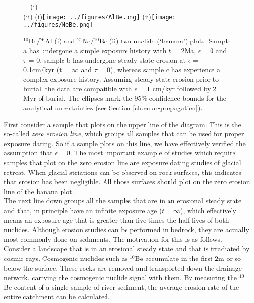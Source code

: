 \begin{figure}[!ht]
  \centering
  \ifpdf
  \def\svgwidth{.8\textwidth}
  ~~(i)~\\
  \def\svgwidth{.8\textwidth}
  (ii)
  \else
  (i)\texttt{[image: ../figures/AlBe.png]}
  (ii)\texttt{[image: ../figures/NeBe.png]}
  \fi
  \caption{$^{10}$Be/$^{26}$Al (i) and $^{21}$Ne/$^{10}$Be (ii) two
    nuclide (`banana') plots. Sample a has undergone a simple exposure
    history with $t$ = 2Ma, $\epsilon = 0$ and $\tau$ = 0, sample b has
    undergone steady-state erosion at $\epsilon$ = 0.1cm/kyr (t =
    $\infty$ and $\tau$ = 0), whereas sample c has experience a complex
    exposure history. Assuming steady-state erosion prior to burial, the
    data are compatible with $\epsilon$ = 1 cm/kyr followed by 2 Myr of
    burial. The ellipses mark the 95\% confidence bounds for the
    analytical uncertainties (see Section \ref{ch:error-propagation}).}
  \label{fig:banana}
\end{figure}

First consider a sample that plots on the upper line of the
diagram. This is the so-called \emph{zero erosion line}, which groups
all samples that can be used for proper exposure dating. So if a
sample plots on this line, we have effectively verified the assumption
that $\epsilon=0$.  The most important example of studies which
require samples that plot on the zero erosion line are exposure dating
studies of glacial retreat. When glacial striations can be observed on
rock surfaces, this indicates that erosion has been negligible. All
those surfaces should plot on the zero erosion line of the banana
plot.\\

The next line down groups all the samples that are in an erosional
steady state and that, in principle have an infinite exposure age
($t=\infty$), which effectively means an exposure age that is greater
than five times the half lives of both nuclides.  Although erosion
studies can be performed in bedrock, they are actually most commonly
done on sediments. The motivation for this is as follows. Consider a
landscape that is in an erosional steady state and that is irradiated
by cosmic rays. Cosmogenic nuclides such as $^{10}$Be accumulate in
the first 2m or so below the surface. These rocks are removed and
transported down the drainage network, carrying the cosmogenic nuclide
signal with them. By measuring the $^{10}$Be content of a single
sample of river sediment, the average erosion rate of the entire
catchment can be calculated.\\

